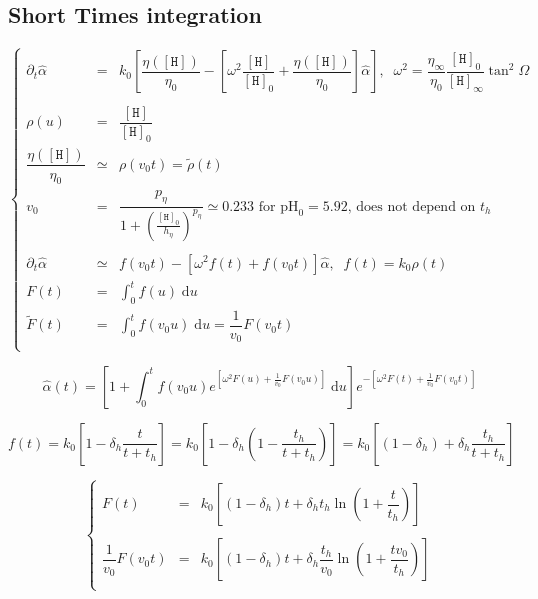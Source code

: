 \documentclass[aps,onecolumn,11pt]{revtex4}
\newcommand{\mychem}[1]{\mathtt{#1}}
\newcommand{\myconc}[1]{\left\lbrack{#1}\right\rbrack}
\newcommand{\spproton}{\mychem{H}}
\newcommand{\proton}{\myconc{\spproton}}
\newcommand{\pH}{\ensuremath{\mathrm{pH}}}
\begin{document}
\subsection{Short Times integration}
\begin{equation}
\left\lbrace
\begin{array}{rcl}
	\partial_t \hat\alpha & = & k_0 \left[ \dfrac{\eta(\proton)}{\eta_0} - \left[ \omega^2 \dfrac{\proton}{\proton_0} + \dfrac{\eta(\proton)}{\eta_0} \right] \hat\alpha \right], \;\; \omega^2 = \dfrac{\eta_\infty}{\eta_0}\dfrac{\proton_0}{\proton_\infty}\tan^2\Omega\\
	\\
	\rho(u) & = & \dfrac{\proton}{\proton_0}\\
	\dfrac{\eta(\proton)}{\eta_0} & \simeq & \rho( v_0 t) = \tilde\rho(t) \\
	v_0 & = & \dfrac{p_\eta}{1+\left(\frac{\proton_0}{h_\eta}\right)^{p_\eta}}\simeq 0.233\text{ for $\pH_0=5.92$, does not depend on $t_h$}\\
	\\
\partial_t\hat\alpha	 & \simeq &  f(v_0t) - \left[ \omega^2 f(t) +  f(v_0t) \right] \hat\alpha,\;\;f(t) = k_0 \rho(t) \\
	 F(t) & = & \int_0^t f(u) \; \mathrm{d}u \\
	 \tilde F(t) & = & \int_0^t f(v_0 u) \; \mathrm{d}u = \dfrac{1}{v_0} F(v_0t)\\
\end{array}
\right.
\end{equation}

\begin{equation}
		 \hat\alpha(t) =  \left[ 1 + \int_0^t f(v_0u) e^{\left[\omega^2 F(u)+\frac{1}{v_0}F(v_0u)\right]}\;\mathrm{d}u\right]
		  e^{-\left[\omega^2 F(t)+\frac{1}{v_0}F(v_0 t)\right]}
\end{equation}

\begin{equation}
	f(t) = k_0\left[ 1 - \delta_h \dfrac{t}{t+t_h} \right] = k_0\left[ 1 - \delta_h \left( 1- \dfrac{t_h}{t+t_h}\right) \right] 
	= k_0 \left[ (1-\delta_h) + \delta_h \dfrac{t_h}{t+t_h}\right]
\end{equation}

\begin{equation}
\left\lbrace
\begin{array}{rcl}
 F(t) & = & k_0 \left[ (1-\delta_h) t + \delta_h t_h \ln\left( 1+ \dfrac{t}{t_h}\right)\right]\\
 \\
 \dfrac{1}{v_0}F(v_0t) & = & k_0 \left[ (1-\delta_h) t + \delta_h \dfrac{t_h}{v_0} \ln\left( 1+ \dfrac{tv_0}{t_h}\right)\right] \\
\end{array}
\right.
\end{equation}
\end{document}
